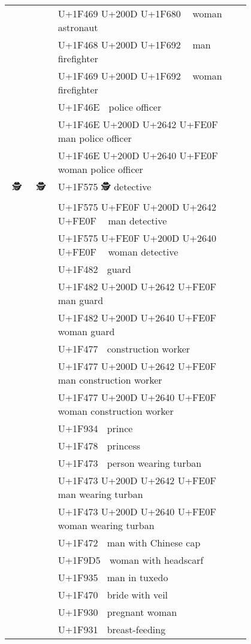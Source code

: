 \documentclass[a4paper,12pt]{ltjarticle}
\newcommand{\fontA}[1]{{\fontspec[RawFeature={mode=harf,dist,ccmp}]{Segoe UI Emoji} #1}}
\newcommand{\fontB}[1]{{\fontspec[RawFeature={mode=harf,dist,ccmp}]{Noto Color Emoji} #1}}
\begin{document}
\begin{longtable}[c]{ccp{0.8\linewidth}}
\fontA{👩‍🚀}&\fontB{👩‍🚀}&U+1F469 U+200D U+1F680 👩‍🚀 woman astronaut\\
\fontA{👨‍🚒}&\fontB{👨‍🚒}&U+1F468 U+200D U+1F692 👨‍🚒 man firefighter\\
\fontA{👩‍🚒}&\fontB{👩‍🚒}&U+1F469 U+200D U+1F692 👩‍🚒 woman firefighter\\
\fontA{👮}&\fontB{👮}&U+1F46E 👮 police officer\\
\fontA{👮‍♂️}&\fontB{👮‍♂️}&U+1F46E U+200D U+2642 U+FE0F 👮‍♂️ man police officer\\
\fontA{👮‍♀️}&\fontB{👮‍♀️}&U+1F46E U+200D U+2640 U+FE0F 👮‍♀️ woman police officer\\
\fontA{🕵}&\fontB{🕵}&U+1F575 🕵 detective\\
\fontA{🕵️‍♂️}&\fontB{🕵️‍♂️}&U+1F575 U+FE0F U+200D U+2642 U+FE0F 🕵️‍♂️ man detective\\
\fontA{🕵️‍♀️}&\fontB{🕵️‍♀️}&U+1F575 U+FE0F U+200D U+2640 U+FE0F 🕵️‍♀️ woman detective\\
\fontA{💂}&\fontB{💂}&U+1F482 💂 guard\\
\fontA{💂‍♂️}&\fontB{💂‍♂️}&U+1F482 U+200D U+2642 U+FE0F 💂‍♂️ man guard\\
\fontA{💂‍♀️}&\fontB{💂‍♀️}&U+1F482 U+200D U+2640 U+FE0F 💂‍♀️ woman guard\\
\fontA{👷}&\fontB{👷}&U+1F477 👷 construction worker\\
\fontA{👷‍♂️}&\fontB{👷‍♂️}&U+1F477 U+200D U+2642 U+FE0F 👷‍♂️ man construction worker\\
\fontA{👷‍♀️}&\fontB{👷‍♀️}&U+1F477 U+200D U+2640 U+FE0F 👷‍♀️ woman construction worker\\
\fontA{🤴}&\fontB{🤴}&U+1F934 🤴 prince\\
\fontA{👸}&\fontB{👸}&U+1F478 👸 princess\\
\fontA{👳}&\fontB{👳}&U+1F473 👳 person wearing turban\\
\fontA{👳‍♂️}&\fontB{👳‍♂️}&U+1F473 U+200D U+2642 U+FE0F 👳‍♂️ man wearing turban\\
\fontA{👳‍♀️}&\fontB{👳‍♀️}&U+1F473 U+200D U+2640 U+FE0F 👳‍♀️ woman wearing turban\\
\fontA{👲}&\fontB{👲}&U+1F472 👲 man with Chinese cap\\
\fontA{🧕}&\fontB{🧕}&U+1F9D5 🧕 woman with headscarf\\
\fontA{🤵}&\fontB{🤵}&U+1F935 🤵 man in tuxedo\\
\fontA{👰}&\fontB{👰}&U+1F470 👰 bride with veil\\
\fontA{🤰}&\fontB{🤰}&U+1F930 🤰 pregnant woman\\
\fontA{🤱}&\fontB{🤱}&U+1F931 🤱 breast-feeding\\

\end{longtable}
\end{document}
